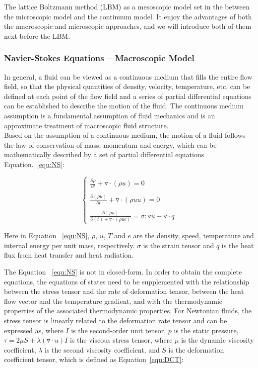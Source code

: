 The lattice Boltzmann method (LBM) as a mesoscopic model set in the between the microscopic model and the continuum model. It enjoy the advantages of both the macroscopic and microscopic approaches, and we will introduce both of them next before the LBM.

\subsubsection{Navier-Stokes Equations -- Macroscopic Model} \label{sec:nse}
In general, a fluid can be viewed as a continuous medium that fills the entire flow field, so that the physical quantities of density, velocity, temperature, etc. can be defined at each point of the flow field and a series of partial differential equations can be established to describe the motion of the fluid. The continuous medium assumption is a fundamental assumption of fluid mechanics and is an approximate treatment of macroscopic fluid structure.\\

Based on the assumption of a continuous medium, the motion of a fluid follows the law of conservation of mass, momentum and energy, which can be mathematically described by a set of partial differential equations Equation.~\ref{equ:NS}:

\begin{equation}
    \left\{\begin{matrix}
\frac{\partial \rho}{\partial t} + \triangledown \cdot (\rho u) = 0\\ 
\\
\frac{\partial (\rho u)}{\partial t} + \triangledown \cdot (\rho u u) = 0\\ 
\\
\frac{\partial (\rho u)}{\partial (t) + \triangledown \cdot (\rho u e)} = \sigma : \triangledown u - \triangledown \cdot q
\end{matrix}\right.
\label{equ:NS}
\end{equation}

Here in Equation ~\ref{equ:NS}, $\rho$, $u$, $T$ and $e$ are the density, speed, temperature and internal energy per unit mass, respectively. $\sigma$ is the strain tensor and $q$ is the heat flux from heat transfer and heat radiation.

The Equation ~\ref{equ:NS} is not in closed-form. In order to obtain the complete equations, the equations of states need to be supplemented with the relationship between the stress tensor and the rate of deformation tensor, between the heat flow vector and the temperature gradient, and with the thermodynamic properties of the associated thermodynamic properties. For Newtonian fluids, the stress tensor is linearly related to the deformation rate tensor and can be expressed as, where $I$ is the second-order unit tensor, $p$ is the static pressure, $\tau = 2 \mu S + \lambda(\triangledown \cdot u)I$ is the viscous stress tensor, where $\mu$ is the dynamic viscosity coefficient, $\lambda$ is the second viscosity coefficient, and $S$ is the deformation coefficient tensor, which is defined as Equation~\ref{equ:DCT}:


